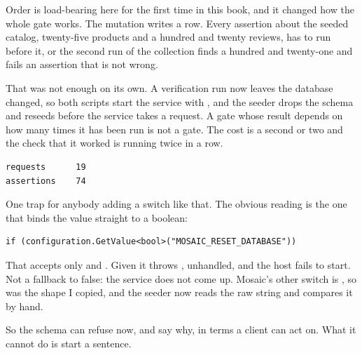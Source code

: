 %
Order is load-bearing here for the first time in this book, and it changed how
the whole gate works. The mutation writes a row. Every assertion about the
seeded catalog, twenty-five products and a hundred and twenty reviews, has to
run before it, or the second run of the collection finds a hundred and
twenty-one and fails an assertion that is not wrong.

That was not enough on its own. A verification run now leaves the database
changed, so both scripts start the service with
, and the seeder drops the schema and reseeds
before the service takes a request. A gate whose result depends on how many
times it has been run is not a gate. The cost is a second or two and the check
that it worked is running  twice in a row.

\begin{verbatim}
requests      19
assertions    74
\end{verbatim}

%
One trap for anybody adding a switch like that. The obvious reading is the one
that binds the value straight to a boolean:

\begin{verbatim}
if (configuration.GetValue<bool>("MOSAIC_RESET_DATABASE"))
\end{verbatim}

That accepts only  and . Given  it throws
, unhandled, and the host fails to start. Not a
fallback to false: the service does not come up. Mosaic's other switch is
, so  was the shape I copied, and the
seeder now reads the raw string and compares it by hand.

So the schema can refuse now, and say why, in terms a client can act on. What it
cannot do is start a sentence.
